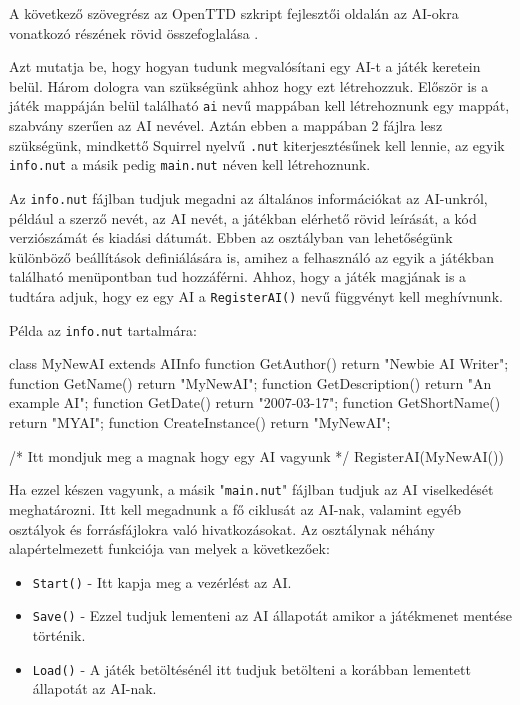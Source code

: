 
A következő szövegrész az OpenTTD szkript fejlesztői oldalán az AI-okra vonatkozó részének rövid összefoglalása \cite{noaidev}.

Azt mutatja be, hogy hogyan tudunk megvalósítani egy AI-t a játék keretein belül. Három dologra van szükségünk ahhoz hogy ezt létrehozzuk. Először is a játék mappáján belül található \texttt{ai} nevű mappában kell létrehoznunk egy mappát, szabvány szerűen az AI nevével. Aztán ebben a mappában 2 fájlra lesz szükségünk, mindkettő Squirrel nyelvű \texttt{.nut} kiterjesztésűnek kell lennie, az egyik \texttt{info.nut} a másik pedig \texttt{main.nut} néven kell létrehoznunk.

Az \texttt{info.nut} fájlban tudjuk megadni az általános információkat az AI-unkról, például a szerző nevét, az AI nevét, a játékban elérhető rövid leírását, a kód verziószámát és kiadási dátumát. Ebben az osztályban van lehetőségünk különböző beállítások definiálására is, amihez a felhasználó az egyik a játékban található menüpontban tud hozzáférni. Ahhoz, hogy a játék magjának is a tudtára adjuk, hogy ez egy AI a \texttt{RegisterAI()} nevű függvényt kell meghívnunk.

Példa az \texttt{info.nut} tartalmára:

\begin{cpp}
class MyNewAI extends AIInfo
{
  function GetAuthor()        { return "Newbie AI Writer"; }
  function GetName()          { return "MyNewAI"; }
  function GetDescription()   { return "An example AI"; }
  function GetDate()          { return "2007-03-17"; }
  function GetShortName()     { return "MYAI"; }
  function CreateInstance()   { return "MyNewAI"; }
}

/* Itt mondjuk meg a magnak hogy egy AI vagyunk */
RegisterAI(MyNewAI())
\end{cpp}

Ha ezzel készen vagyunk, a másik "\texttt{main.nut}" fájlban tudjuk az AI viselkedését meghatározni. Itt kell megadnunk a fő ciklusát az AI-nak, valamint egyéb osztályok és forrásfájlokra való hivatkozásokat. Az osztálynak néhány alapértelmezett funkciója van melyek a következőek:
\begin{itemize}
	\item \texttt{Start()} - Itt kapja meg a vezérlést az AI.
	\item \texttt{Save()} - Ezzel tudjuk lementeni az AI állapotát amikor a játékmenet mentése történik.
	\item \texttt{Load()} - A játék betöltésénél itt tudjuk betölteni a korábban lementett állapotát az AI-nak.
\end{itemize}

